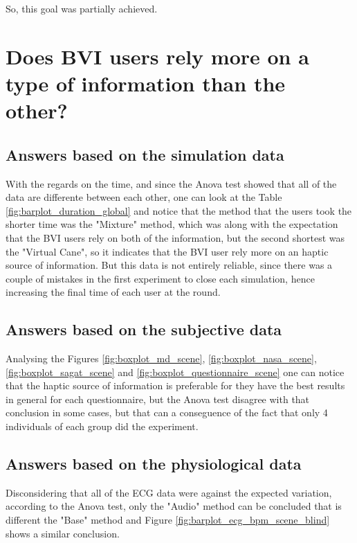 So, this goal was partially achieved.


\section{Does BVI users rely more on a type of information than the other?}

\subsection{Answers based on the simulation data}

With the regards on the time, and since the Anova test showed that all of the data are differente between each other, one can look at the Table \ref{fig:barplot_duration_global} and notice that the method that the users took the shorter time was the "Mixture" method, which was along with the expectation that the BVI users rely on both of the information, but the second shortest was the "Virtual Cane", so it indicates that the BVI user rely more on an haptic source of information. But this data is not entirely reliable, since there was a couple of mistakes in the first experiment to close each simulation, hence increasing the final time of each user at the round.

\subsection{Answers based on the subjective data}

Analysing the Figures \ref{fig:boxplot_md_scene}, \ref{fig:boxplot_nasa_scene}, \ref{fig:boxplot_sagat_scene} and \ref{fig:boxplot_questionnaire_scene} one can notice that the haptic source of information is preferable for they have the best results in general for each questionnaire, but the Anova test disagree with that conclusion in some cases, but that can a conseguence of the fact that only 4 individuals of each group did the experiment. 

\subsection{Answers based on the physiological data}

Disconsidering that all of the ECG data were against the expected variation, according to the Anova test, only the "Audio" method can be concluded that is different the "Base" method and Figure \ref{fig:barplot_ecg_bpm_scene_blind} shows a similar conclusion.


